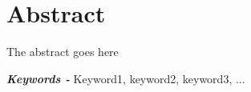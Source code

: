 \renewcommand{\keywords}{{\itshape \bfseries Keywords - }}
\chapter*{Abstract} 
The abstract goes here



\keywords{Keyword1, keyword2, keyword3, ...}